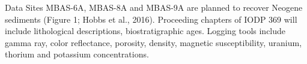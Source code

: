 \subsubsection{}Data
Sites MBAS-6A, MBAS-8A and MBAS-9A are planned to recover Neogene sediments (Figure 1; Hobbs et al., 2016). Proceeding chapters of IODP 369 will include lithological descriptions, biostratigraphic ages. Logging tools include gamma ray, color reflectance, porosity, density, magnetic susceptibility, uranium, thorium and potassium concentrations.
